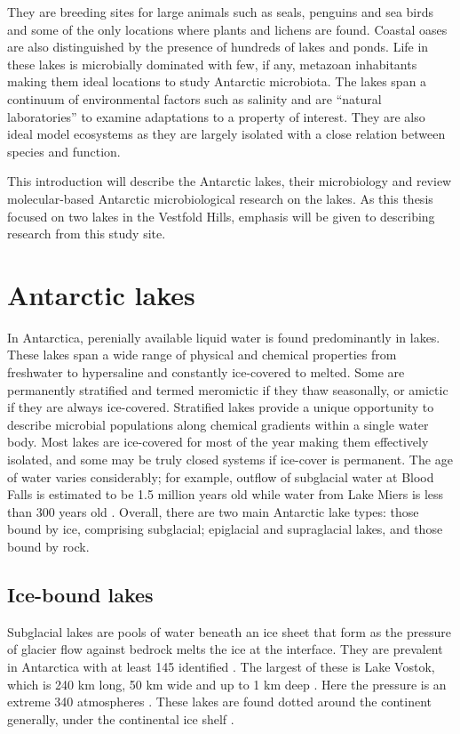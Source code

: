 They are breeding sites for large animals such as seals, penguins and sea birds and some of the only locations where plants and lichens are found.
Coastal oases are also distinguished by the presence of hundreds of lakes and ponds.
Life in these lakes is microbially dominated with few, if any, metazoan inhabitants \cite{Laybourn-Parry1997} making them ideal locations to study Antarctic microbiota. 
The lakes span a continuum of environmental factors such as salinity and are ``natural laboratories'' to examine adaptations to a property of interest. 
They are also ideal model ecosystems as they are largely isolated with a close relation between species and function.

This introduction will describe the Antarctic lakes, their microbiology and review molecular-based Antarctic microbiological research on the lakes.
As this thesis focused on two lakes in the Vestfold Hills, emphasis will be given to describing research from this study site.


\section{Antarctic lakes}
In Antarctica, perenially available liquid water is found predominantly in lakes. 
These lakes span a wide range of physical and chemical properties from freshwater to hypersaline and constantly ice-covered to melted.
Some are permanently stratified and termed meromictic if they thaw seasonally, or amictic if they are always ice-covered.
Stratified lakes provide a unique opportunity to describe microbial populations along chemical gradients within a single water body. 
Most lakes are ice-covered for most of the year making them effectively isolated, and some may be truly closed systems if ice-cover is permanent.
The age of water varies considerably; for example, outflow of subglacial water at Blood Falls is estimated to be 1.5 million years old \cite{Mikucki2009} while water from Lake Miers is less than 300 years old \cite{Green1988}. 
Overall, there are two main Antarctic lake types: those bound by ice, comprising subglacial; epiglacial and supraglacial lakes, and those bound by rock.

\subsection{Ice-bound lakes}
Subglacial lakes are pools of water beneath an ice sheet that form as the pressure of glacier flow against bedrock melts the ice at the interface. 
They are prevalent in Antarctica with at least 145 identified \cite{Siegert2005}.
The largest of these is Lake Vostok, which is 240 km long, 50 km wide and up to 1 km deep \cite{Siegert2001}.
Here the pressure is an extreme 340 atmospheres \cite{Siegert2001}.
These lakes are found dotted around the continent generally, under the continental ice shelf \cite{Siegert2001}.%


